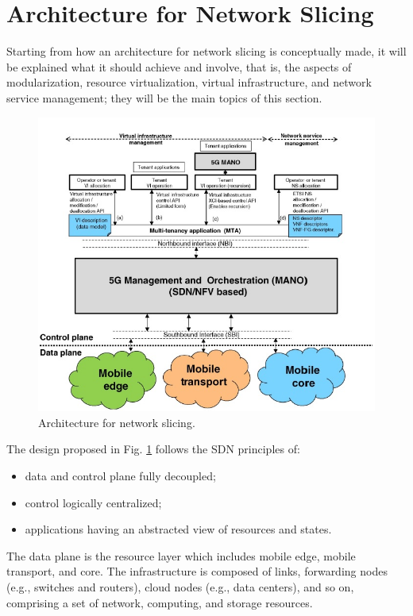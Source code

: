 \documentclass{report}
\begin{document}
\newpage
\section{Architecture for Network Slicing} 
Starting from how an architecture for network slicing is conceptually made, it will be explained what it should achieve and involve, that is, the aspects of modularization, resource virtualization, virtual infrastructure, and network service management; they will be the main topics of this section.
\begin{figure}[h]
\centering
\includegraphics[scale=0.67]{pics/2.JPG}
\caption{Architecture for network slicing. \cite{al20185g}} 
\label{Arch}
\end{figure}
The design proposed in Fig. \ref{Arch} follows the SDN principles of:
\begin{itemize}
\item data and control plane fully decoupled;
\end{itemize}
\begin{itemize}
\item control logically centralized;
\end{itemize}
\begin{itemize}
\item applications having an abstracted view of resources and states.
\end{itemize}
The data plane is the resource layer which includes mobile edge, mobile transport, and core. The infrastructure is composed of links, forwarding nodes (e.g., switches and routers), cloud nodes (e.g., data centers), and so on, comprising a set of network, computing, and storage resources.\\
\end{document}
